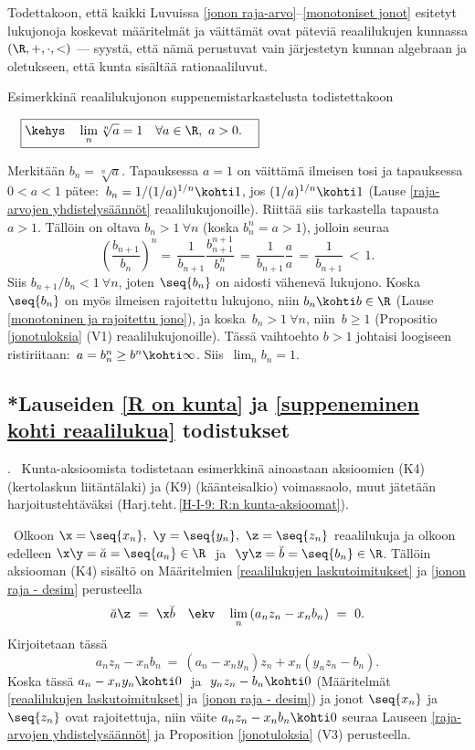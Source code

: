 Todettakoon, että kaikki Luvuissa \ref{jonon raja-arvo}--\ref{monotoniset jonot} esitetyt
lukujonoja koskevat määritelmät ja väittämät ovat päteviä reaalilukujen kunnassa
$(\R,+,\cdot,<)$ --- syystä, että nämä perustuvat vain järjestetyn kunnan algebraan ja
oletukseen, että kunta sisältää rationaaliluvut. 

Esimerkkinä reaalilukujonon suppenemistarkastelusta todistettakoon
\begin{Prop} \label{juurilemma} $\quad \displaystyle{\boxed{\kehys\quad 
\lim_n \sqrt[n]{a}=1 \quad \forall a\in\R,\ a>0. \quad}}$ 
\end{Prop}
\tod Merkitään $b_n=\sqrt[n]{a}$. Tapauksessa $a=1$ on väittämä ilmeisen tosi ja tapauksessa 
$0<a<1$ pätee: $\,b_n=1/(1/a)^{1/n} \kohti 1$, jos $(1/a)^{1/n} \kohti 1$ 
(Lause \ref{raja-arvojen yhdistelysäännöt} reaalilukujonoille). Riittää siis tarkastella
tapausta $a>1$. Tällöin on oltava $b_n>1\ \forall n$ (koska $b_n^n=a>1$), jolloin seuraa
\[
\left(\frac{b_{n+1}}{b_n}\right)^n =\, \frac{1}{b_{n+1}}\frac{b_{n+1}^{n+1}}{b_n^n}
\,=\, \frac{1}{b_{n+1}}\frac{a}{a} \,=\, \frac{1}{b_{n+1}} \,<\, 1. 
\]  
Siis $b_{n+1}/b_n<1\ \forall n$, joten $\seq{b_n}$ on aidosti vähenevä lukujono. Koska 
$\seq{b_n}$ on myös ilmeisen rajoitettu lukujono, niin $b_n \kohti b\in\R$
(Lause \ref{monotoninen ja rajoitettu jono}), ja koska $\,b_n>1\ \forall n$, niin $\,b \ge 1$
(Propositio \ref{jonotuloksia} (V1) reaalilukujonoille). Tässä vaihtoehto $b>1$ johtaisi
loogiseen ristiriitaan: $\,a=b_n^n \ge b^n\kohti\infty$. Siis $\,\lim_n b_n=1$. \loppu 

\subsection{*Lauseiden \ref{R on kunta} ja \ref{suppeneminen kohti reaalilukua} todistukset}

. \ Kunta-aksioomista todistetaan esimerkkinä ainoastaan 
aksioomien (K4) (kertolaskun liitäntälaki) ja (K9) (käänteisalkio) voimassaolo, muut
jätetään harjoitustehtäväksi (Harj.teht.\,\ref{H-I-9: R:n kunta-aksioomat}). 

 \ Olkoon $\x = \seq{x_n},\ \y = \seq{y_n},\ \z = \seq{z_n}$ reaalilukuja ja olkoon
edelleen $\x\y = \breve{a} = \seq{a_n} \in \R\ $ ja $\ \y\z = \breve{b} = \seq{b_n} \in \R$. 
Tällöin aksiooman (K4) sisältö on Määritelmien \ref{reaalilukujen laskutoimitukset}
ja \ref{jonon raja - desim} perusteella
\[
\breve{a}\z\ =\ \x\breve{b} \quad \ekv \quad \lim_n\,(a_n z_n - x_n b_n)\ =\ 0.
\]
Kirjoitetaan tässä
\[
a_n z_n - x_n b_n\ =\ (a_n - x_n y_n) z_n + x_n (y_n z_n - b_n).
\]
Koska tässä $a_n - x_n y_n \kohti 0\ $ ja $\ y_n z_n - b_n \kohti 0$ (Määritelmät 
\ref{reaalilukujen laskutoimitukset} ja \ref{jonon raja - desim}) ja jonot $\seq{x_n}$
ja $\seq{z_n}$ ovat rajoitettuja, niin väite $a_n z_n - x_n b_n \kohti 0$ seuraa Lauseen
\ref{raja-arvojen yhdistelysäännöt} ja Proposition \ref{jonotuloksia} (V3) perusteella.


